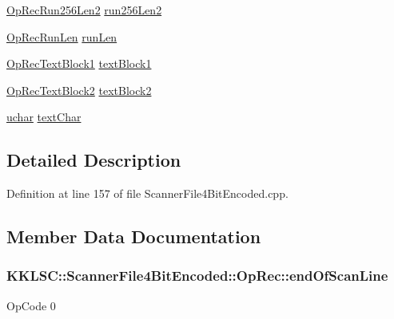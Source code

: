 \begin{DoxyCompactItemize}
\item 
\hyperlink{struct_scanner_file4_bit_encoded_1_1_op_rec_run256_len2}{Op\+Rec\+Run256\+Len2} \hyperlink{union_scanner_file4_bit_encoded_1_1_op_rec_a1b00fe943364fa57541dc23b9fcf7371}{run256\+Len2}
\item 
\hyperlink{struct_scanner_file4_bit_encoded_1_1_op_rec_run_len}{Op\+Rec\+Run\+Len} \hyperlink{union_scanner_file4_bit_encoded_1_1_op_rec_a6de141d96861472fb22626dce3f35dd7}{run\+Len}
\item 
\hyperlink{struct_scanner_file4_bit_encoded_1_1_op_rec_text_block1}{Op\+Rec\+Text\+Block1} \hyperlink{union_scanner_file4_bit_encoded_1_1_op_rec_a6ee1c66393f907875e2fd62711964fab}{text\+Block1}
\item 
\hyperlink{struct_scanner_file4_bit_encoded_1_1_op_rec_text_block2}{Op\+Rec\+Text\+Block2} \hyperlink{union_scanner_file4_bit_encoded_1_1_op_rec_a1915995bf9087e34eb3964eeb22ac4c1}{text\+Block2}
\item 
\hyperlink{namespace_k_k_b_ace9969169bf514f9ee6185186949cdf7}{uchar} \hyperlink{union_scanner_file4_bit_encoded_1_1_op_rec_a3b97c098a5d35aa62269cbdf2ac20d78}{text\+Char}
\end{DoxyCompactItemize}


\subsection{Detailed Description}


Definition at line 157 of file Scanner\+File4\+Bit\+Encoded.\+cpp.



\subsection{Member Data Documentation}
\subsubsection[{\texorpdfstring{end\+Of\+Scan\+Line}{endOfScanLine}}]{ K\+K\+L\+S\+C\+::\+Scanner\+File4\+Bit\+Encoded\+::\+Op\+Rec\+::end\+Of\+Scan\+Line}\hypertarget{union_scanner_file4_bit_encoded_1_1_op_rec_a6804eecd59e1568f2b8f8e0812235a70}{}\label{union_scanner_file4_bit_encoded_1_1_op_rec_a6804eecd59e1568f2b8f8e0812235a70}
Op\+Code 0 

